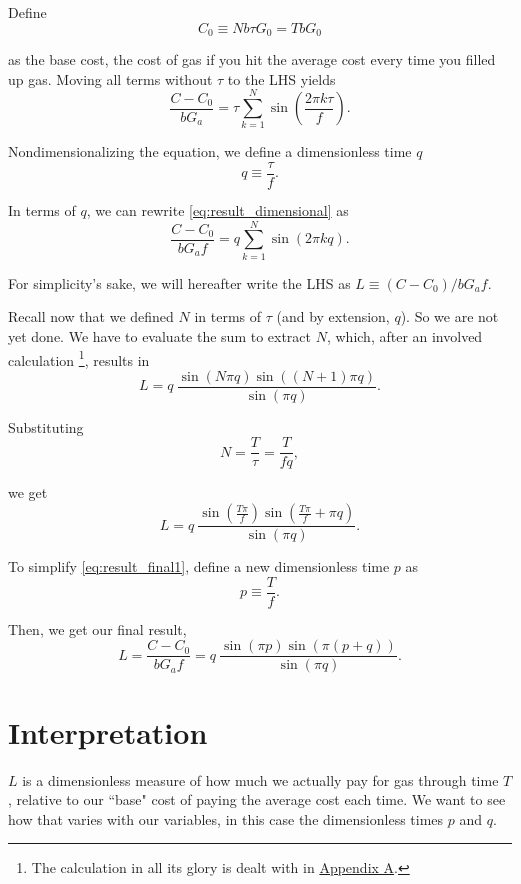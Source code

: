 \documentclass[11pt]{article}
\begin{document}
Define 
$$
C_0 \equiv Nb\tau G_0 = TbG_0
$$

 as the base cost, the cost of gas if you hit the average cost every time you filled up gas. Moving all terms without $\tau$ to the LHS yields
\begin{equation}
\frac{C - C_0}{b G_a} = \tau \sum_{k=1}^{N}{\sin \left( \frac{2 \pi k \tau}{f}\right)} \label{eq:result_dimensional}.
\end{equation}

Nondimensionalizing the equation, we define a dimensionless time $q$
$$
q \equiv \frac{\tau}{f}.
$$ 

In terms of $q$, we can rewrite \eqref{eq:result_dimensional} as
\begin{equation}
\frac{C - C_0}{b G_a f} = q \sum_{k=1}^{N}{\sin \left( 2 \pi k q\right)}. \label{eq:result_dimensionless}
\end{equation}

For simplicity's sake, we will hereafter write the LHS as $L \equiv (C - C_0) / b G_a f$. \\

\par
Recall now that we defined $N$ in terms of $\tau$ (and by extension, $q$). So we are not yet done. We have to evaluate the sum to extract $N$, which, after an involved calculation \footnote{The calculation in all its glory is dealt with in \hyperref[subsec:sine_sum]{Appendix A}.}, results in
\begin{equation}
L = q \: \frac{\sin(N\pi q) \sin((N+1)\pi q)}{\sin(\pi q)}.
\end{equation}

Substituting 
$$
N = \frac{T}{\tau} = \frac{T}{fq},
$$

we get
\begin{equation}
L = q \: \frac{\sin\left(\frac{T \pi}{f}\right) \sin\left(\frac{T \pi}{f} + \pi q\right)}{\sin(\pi q)}. \label{eq:result_final1}
\end{equation}

To simplify \eqref{eq:result_final1}, define a new dimensionless time $p$ as 
$$
p \equiv \frac{T}{f}.
$$ 

Then, we get our final result,
\begin{equation}
\boxed{L = \frac{C - C_0}{b G_a f} = q \: \frac{\sin(\pi p) \sin(\pi (p+q))}{\sin(\pi q)}}. \label{eq:result_final2}
\end{equation}

\section*{Interpretation}
\label{sec:interpetation}
$L$ is a dimensionless measure of how much we actually pay for gas through time $T$, relative to our ``base" cost of paying the average cost each time. We want to see how that varies with our variables, in this case the dimensionless times $p$ and $q$. \\
\end{document}
